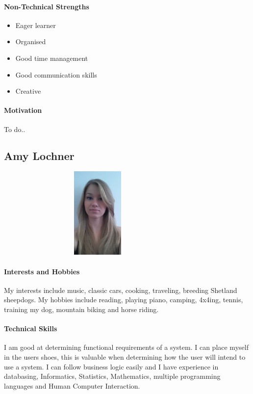 \documentclass[english]{article}
\begin{document}
			\paragraph{Non-Technical Strengths}
			\begin{itemize}
				\setlength\itemsep{0.2em}
			        \item Eager learner
			        \item Organised 
			        \item Good time management
			        \item Good communication skills
			        \item Creative
			\end{itemize}
			
			\paragraph{Motivation}
			To do..
		
		\newpage
		\subsection{Amy Lochner}
		    \begin{figure}
				\begin{center}
					\includegraphics[width=8cm, height=4.5cm, angle=90]{amy.jpg}
				\end{center}
			\end{figure}
			\paragraph{Interests and Hobbies}
			My interests include music, classic cars, cooking, traveling, breeding Shetland sheepdogs. My hobbies include reading, playing piano, camping, 4x4ing, tennis, training my dog, mountain biking and horse riding.
			
			\paragraph{Technical Skills}
			I am good at determining functional requirements of a system. I can place myself in the users shoes, this is valuable when determining how the user will intend to use a system. I can follow business logic easily and I have experience in databasing, Informatics, Statistics, Mathematics, multiple programming languages and Human Computer Interaction.
			
\end{document}
